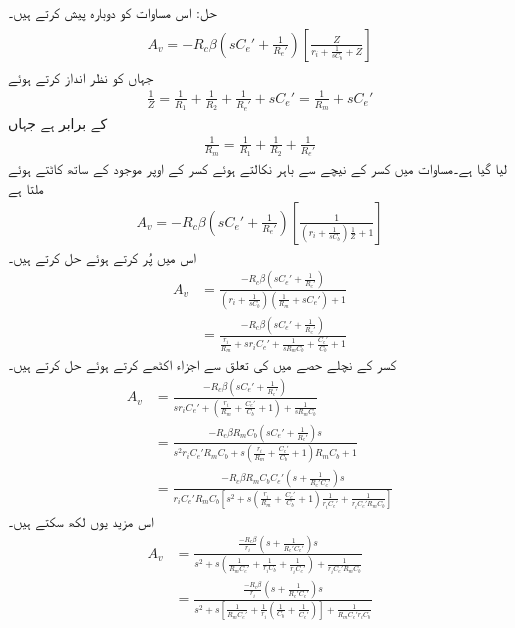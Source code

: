 حل: اس مساوات کو دوبارہ پیش کرتے ہیں۔
\begin{gather}
\begin{aligned} \label{مساوات_تعددی_ردعمل_قابو_مخارج_کپیسٹر_الف}
A_v =-R_c \beta \left(s C_e'+\frac{1}{R_e'} \right) \left[\frac{Z}{r_i+\frac{1}{sC_b}+Z} \right]
\end{aligned}
\end{gather}
جہاں  کو نظر انداز کرتے ہوئے
\begin{align*}
\frac{1}{Z}=\frac{1}{R_1}+\frac{1}{R_2}+\frac{1}{R_e'}+s C_e'=\frac{1}{R_m}+s C_e'
\end{align*}
کے برابر ہے جہاں
\begin{align*}
\frac{1}{R_m}=\frac{1}{R_1}+\frac{1}{R_2}+\frac{1}{R_e'}
\end{align*}
لیا گیا ہے۔مساوات  میں کسر کے نیچے   سے  باہر نکالتے ہوئے کسر کے اوپر موجود  کے ساتھ کاٹتے ہوئے ملتا ہے
\begin{align*}
A_v=-R_c \beta \left(s C_e'+\frac{1}{R_e'} \right) \left[\frac{1}{\left(r_i+\frac{1}{sC_b}\right)\frac{1}{Z}+1} \right]
\end{align*}
اس میں  پُر کرتے ہوئے حل کرتے ہیں۔
\begin{align*}
A_v&=\frac{-R_c \beta \left(s C_e'+\frac{1}{R_e'} \right)}{\left(r_i+\frac{1}{sC_b}\right)\left(\frac{1}{R_m}+sC_e' \right)+1}\\
&=\frac{-R_c \beta \left(s C_e'+\frac{1}{R_e'} \right)}{\frac{r_i}{R_m}+s r_i C_e'+\frac{1}{s R_mC_b}+\frac{C_e'}{C_b}+1}
\end{align*}
کسر کے نچلے حصے میں  کی تعلق سے اجزاء اکٹھے کرتے  ہوئے حل کرتے ہیں۔
\begin{align*}
A_v&=\frac{-R_c \beta \left(s C_e'+\frac{1}{R_e'}\right)}{s r_i C_e'+\left(\frac{r_i}{R_m}+\frac{C_e'}{C_b}+1\right)+\frac{1}{s R_mC_b}}\\
&=\frac{-R_c \beta R_m C_b\left(s C_e'+\frac{1}{R_e'} \right) s}{s^2 r_i C_e' R_m C_b+s \left(\frac{r_i}{R_m}+\frac{C_e'}{C_b}+1\right) R_m C_b+1}\\
&=\frac{-R_c \beta R_m C_b  C_e' \left(s+\frac{1}{R_e'  C_e' }\right) s}{ r_i C_e' R_m C_b  \left[s^2+s \left(\frac{r_i}{R_m}+\frac{C_e'}{C_b}+1\right) \frac{1}{r_i C_e'}+\frac{1}{ r_i C_e' R_m C_b} \right]}
\end{align*}
اس مزید یوں لکھ سکتے ہیں۔
\begin{align*}
A_v&=\frac{\frac{-R_c \beta}{r_i}\left(s+\frac{1}{R_e'  C_e' }\right) s}{s^2+s \left(\frac{1}{R_m C_e'}+\frac{1}{r_i C_b}+\frac{1}{r_i C_e'}\right) +\frac{1}{ r_i C_e' R_m C_b}}\\
&=\frac{\frac{-R_c \beta}{r_i}\left(s+\frac{1}{R_e'  C_e' }\right) s}{s^2+s \left[\frac{1}{R_m C_e'}+\frac{1}{r_i} \left(\frac{1}{C_b}+\frac{1}{ C_e'} \right)\right] +\frac{1}{R_m C_e' r_i C_b}}
\end{align*}
